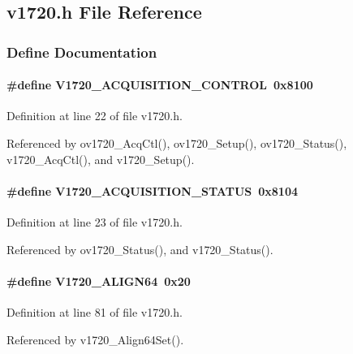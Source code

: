 \subsection{v1720.h File Reference}
\label{v1720_8h}


\subsubsection{Define Documentation}
\paragraph[{V1720\_\-ACQUISITION\_\-CONTROL}]{\setlength{\rightskip}{0pt plus 5cm}\#define V1720\_\-ACQUISITION\_\-CONTROL~0x8100}\hfill\label{v1720_8h_ae427b62f71c332416dfee3a78f6db998}


Definition at line 22 of file v1720.h.

Referenced by ov1720\_\-AcqCtl(), ov1720\_\-Setup(), ov1720\_\-Status(), v1720\_\-AcqCtl(), and v1720\_\-Setup().
\paragraph[{V1720\_\-ACQUISITION\_\-STATUS}]{\setlength{\rightskip}{0pt plus 5cm}\#define V1720\_\-ACQUISITION\_\-STATUS~0x8104}\hfill\label{v1720_8h_a8e87d28765da6ce92fcf5644e0711a2b}


Definition at line 23 of file v1720.h.

Referenced by ov1720\_\-Status(), and v1720\_\-Status().
\paragraph[{V1720\_\-ALIGN64}]{\setlength{\rightskip}{0pt plus 5cm}\#define V1720\_\-ALIGN64~0x20}\hfill\label{v1720_8h_a17721bf792805667df5fe2bd4058ef28}


Definition at line 81 of file v1720.h.

Referenced by v1720\_\-Align64Set().
